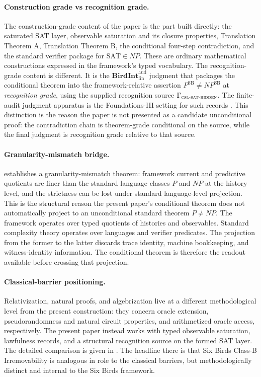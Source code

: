 \documentclass[11pt]{article}
\newcommand{\CSLSATHidden}{\Gamma_{\textsc{csl-sat-hidden}}}
\newcommand{\PSB}{P^{\mathrm{SB}}}
\newcommand{\NPSB}{NP^{\mathrm{SB}}}
\newcommand{\BirdInt}{\mathbf{BirdInt}^{\mathrm{aud}}_{\mathrm{fin}}}
\newcommand{\RecognitionGrade}{\emph{recognition grade}}
\theoremstyle{definition}
\begin{document}
\paragraph{Construction grade vs recognition grade.}
The construction-grade content of the paper is the part built directly:
the saturated SAT layer, observable saturation and its closure
properties, Translation Theorem A, Translation Theorem B, the
conditional four-step contradiction, and the standard verifier package
for \(\mathrm{SAT}\in NP\).  These are ordinary mathematical
constructions expressed in the framework's typed vocabulary.  The
recognition-grade content is different.  It is the \(\BirdInt\)
judgment that packages the conditional theorem into the
framework-relative assertion \(\PSB\neq\NPSB\) at
\RecognitionGrade{}, using the supplied recognition source
\(\CSLSATHidden\).  The finite-audit judgment apparatus is the
Foundations-III setting for such records \citep{TsiokosFoundationsIII2026}.
This distinction is the reason the paper is not presented as a
candidate unconditional proof: the contradiction chain is theorem-grade
conditional on the source, while the final judgment is recognition
grade relative to that source.

\paragraph{Granularity-mismatch bridge.}
\citet{TsiokosHiddenness2026} establishes a granularity-mismatch
theorem: framework current and predictive quotients are finer than the
standard language classes \(P\) and \(NP\) at the history level, and
the strictness can be lost under standard language-level projection.  This is the structural reason the
present paper's conditional theorem does not automatically project to
an unconditional standard theorem \(P\neq NP\).  The framework
operates over typed quotients of histories and observables.  Standard
complexity theory operates over languages and verifier predicates.  The
projection from the former to the latter discards trace identity,
machine bookkeeping, and witness-identity information.  The
conditional theorem is therefore the readout available before
crossing that projection.

\paragraph{Classical-barrier positioning.}
Relativization, natural proofs, and algebrization live at a different
methodological level from the present construction: they concern
oracle extension, pseudorandomness and natural circuit properties, and
arithmetized oracle access, respectively.  The present paper instead
works with typed observable saturation, lawfulness records, and a
structural recognition source on the formed SAT layer.  The detailed
comparison is given in .  The headline
there is that Six Birds Class-B Irremovability is analogous in role to
the classical barriers, but methodologically distinct and internal to
the Six Birds framework.
\end{document}
